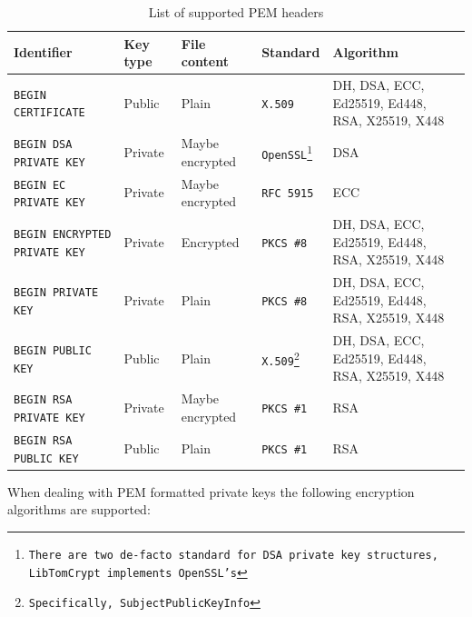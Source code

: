 \documentclass[synpaper]{book}
\begin{document}
\begin{table}[H]
\begin{minipage}{\textwidth}
\begin{small}
\begin{tabular}{|l|l|l|l|p{4.1cm}|}
\hline \textbf{Identifier}                   & \textbf{Key type} & \textbf{File content} & \textbf{Standard} & \textbf{Algorithm} \\
\hline \texttt{BEGIN CERTIFICATE}            & Public            & Plain                 & \texttt{X.509}    & DH, DSA, ECC, Ed25519, Ed448, RSA, X25519, X448 \\
\hline \texttt{BEGIN DSA PRIVATE KEY}        & Private           & Maybe encrypted       & \texttt{OpenSSL\footnote{There are two de-facto standard for DSA private key structures, LibTomCrypt implements OpenSSL's}} & DSA \\
\hline \texttt{BEGIN EC PRIVATE KEY}         & Private           & Maybe encrypted       & \texttt{RFC 5915} & ECC \\
\hline \texttt{BEGIN ENCRYPTED PRIVATE KEY}  & Private           & Encrypted             & \texttt{PKCS \#8} & DH, DSA, ECC, Ed25519, Ed448, RSA, X25519, X448 \\
\hline \texttt{BEGIN PRIVATE KEY}            & Private           & Plain                 & \texttt{PKCS \#8} & DH, DSA, ECC, Ed25519, Ed448, RSA, X25519, X448 \\
\hline \texttt{BEGIN PUBLIC KEY}             & Public            & Plain                 & \texttt{X.509\footnote{Specifically, SubjectPublicKeyInfo}} & DH, DSA, ECC, Ed25519, Ed448, RSA, X25519, X448 \\
\hline \texttt{BEGIN RSA PRIVATE KEY}        & Private           & Maybe encrypted       & \texttt{PKCS \#1} & RSA \\
\hline \texttt{BEGIN RSA PUBLIC KEY}         & Public            & Plain                 & \texttt{PKCS \#1} & RSA \\
\hline
\end{tabular}
\end{small}
\end{minipage}
\caption{List of supported PEM headers}
\label{supported-PEM-headers}
\end{table}

When dealing with PEM formatted private keys the following encryption algorithms are supported:
\end{document}
